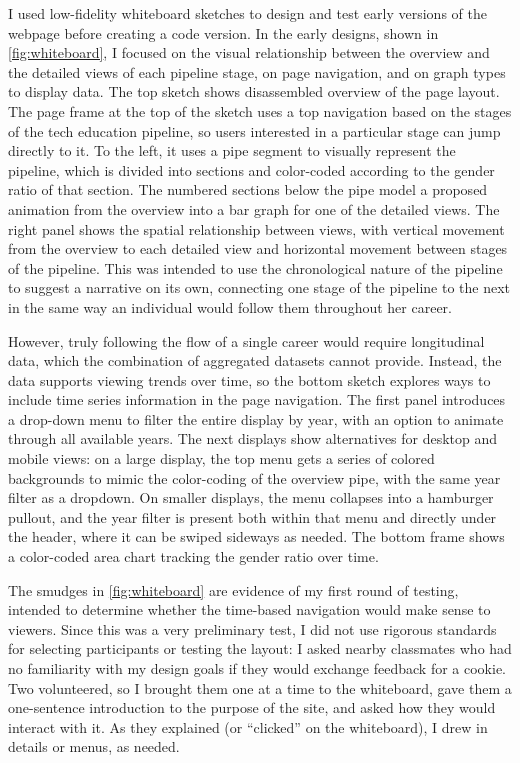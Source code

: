 I used low-fidelity whiteboard sketches to design and test early versions of the webpage before creating a code version. In the early designs, shown in \autoref{fig:whiteboard}, I focused on the visual relationship between the overview and the detailed views of each pipeline stage, on page navigation, and on graph types to display data. The top sketch shows disassembled overview of the page layout. The page frame at the top of the sketch uses a top navigation based on the stages of the tech education pipeline, so users interested in a particular stage can jump directly to it. To the left, it uses a pipe segment to visually represent the pipeline, which is divided into sections and color-coded according to the gender ratio of that section. The numbered sections below the pipe model a proposed animation from the overview into a bar graph for one of the detailed views. The right panel shows the spatial relationship between views, with vertical movement from the overview to each detailed view and horizontal movement between stages of the pipeline. This was intended to use the chronological nature of the pipeline to suggest a narrative on its own, connecting one stage of the pipeline to the next in the same way an individual would follow them throughout her career.

However, truly following the flow of a single career would require longitudinal data, which the combination of aggregated datasets cannot provide. Instead, the data supports viewing trends over time, so the bottom sketch explores ways to include time series information in the page navigation. The first panel introduces a drop-down menu to filter the entire display by year, with an option to animate through all available years. The next displays show alternatives for desktop and mobile views: on a large display, the top menu gets a series of colored backgrounds to mimic the color-coding of the overview pipe, with the same year filter as a dropdown. On smaller displays, the menu collapses into a hamburger pullout, and the year filter is present both within that menu and directly under the header, where it can be swiped sideways as needed. The bottom frame shows a color-coded area chart tracking the gender ratio over time.

The smudges in \autoref{fig:whiteboard} are evidence of my first round of testing, intended to determine whether the time-based navigation would make sense to viewers. Since this was a very preliminary test, I did not use rigorous standards for selecting participants or testing the layout: I asked nearby classmates who had no familiarity with my design goals if they would exchange feedback for a cookie. Two volunteered, so I brought them one at a time to the whiteboard, gave them a one-sentence introduction to the purpose of the site, and asked how they would interact with it. As they explained (or ``clicked'' on the whiteboard), I drew in details or menus, as needed.

